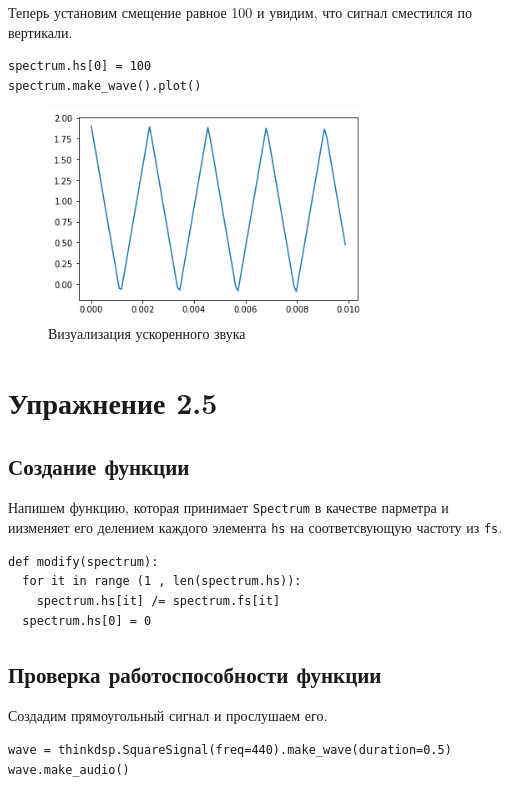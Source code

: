\documentclass[a4paper,12pt]{report}
\begin{document}
Теперь установим смещение равное 100 и увидим, что сигнал сместился по вертикали.

\begin{lstlisting}[caption=Смещение спектра и его визуализация]
spectrum.hs[0] = 100
spectrum.make_wave().plot()
\end{lstlisting}

\begin{figure}[H]
        \centering
        \includegraphics[width=0.75\textwidth]{5.png}
        \caption{Визуализация ускоренного звука}
        \label{fig:fig4_2}
\end{figure}

\chapter{Упражнение 2.5}
\section{Создание функции}

Напишем функцию, которая принимает \texttt{Spectrum} в качестве парметра и иизменяет его делением каждого элемента \texttt{hs} на соответсвующую частоту из \texttt{fs}.

\begin{lstlisting}[caption=Создание функции]
def modify(spectrum):
  for it in range (1 , len(spectrum.hs)):
    spectrum.hs[it] /= spectrum.fs[it]
  spectrum.hs[0] = 0
\end{lstlisting}

\section{Проверка работоспособности функции}

Создадим прямоугольный сигнал и прослушаем его.

\begin{lstlisting}[caption=Создание сигнала и его воспроизведение]
wave = thinkdsp.SquareSignal(freq=440).make_wave(duration=0.5)
wave.make_audio()
\end{lstlisting}
\end{document}
